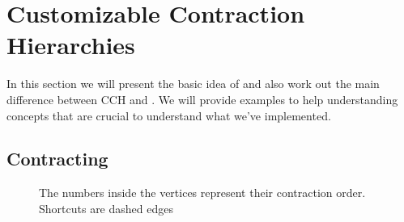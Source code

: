 \chapter{Customizable Contraction Hierarchies}\label{sec:Preliminary_CCH}

In this section we will present the basic idea of \cite[Customization Contraction Hierarchies]{CCH} and also work out the main difference between CCH and \cite[Contraction Hierarchies]{Geisberger_2012}.
We will provide examples to help understanding concepts that are crucial to understand what we've implemented.
\section{Contracting}



\begin{figure}
    \centering
    
    \caption{The numbers inside the vertices represent their contraction order. Shortcuts are dashed edges}
    \label{fig:contrating_and_searching}
\end{figure}

